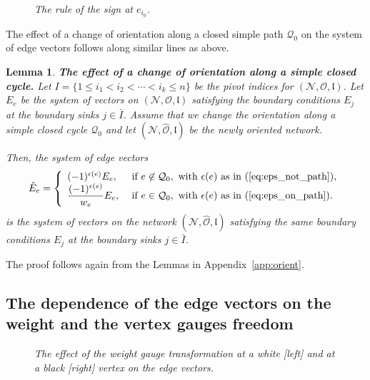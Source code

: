 \documentclass[11pt]{amsart}
\theoremstyle{plain}
\numberwithin{equation}{section}
\newtheorem{lemma}[theorem]{Lemma}
\begin{document}
\begin{figure}%
  \caption{\small{\sl The rule of the sign at $e_{i_0}$.}}\label{fig:edgei_0}
\end{figure}

The effect of a change of orientation along a closed simple path $\mathcal Q_0$ on the system of edge vectors follows along similar lines as above. 

 \begin{lemma}\label{lemma:cycle}\textbf{The effect of a change of orientation along a simple closed cycle.}
Let $I = \{ 1\le i_1 < i_2 < \cdots < i_k\le n\}$ be the pivot indices for $({\mathcal N},\mathcal O,\mathfrak l)$.
Let $E_e$ be the system of vectors on $({\mathcal N},\mathcal O,\mathfrak l)$ satisfying the boundary conditions $E_j$ at the boundary sinks $j\in \bar I$. Assume that we change the orientation along a simple closed cycle $\mathcal Q_0$ and let $({\mathcal N},{\hat {\mathcal O}},\mathfrak l)$ be the newly oriented network. 

Then, the system of edge vectors 
\begin{equation}\label{eq:hat_E_Q}
{\hat E}_e = \left\{ \begin{array}{ll}
 (-1)^{\epsilon(e)} E_e, & \mbox{ if } e\not \in \mathcal Q_0, \mbox{ with } \epsilon(e) \mbox{ as in (\ref{eq:eps_not_path})},\\
\displaystyle \frac{(-1)^{\epsilon(e)}}{w_e} E_e, & \mbox{ if } e\in \mathcal Q_0, \mbox{ with } \epsilon(e) \mbox{ as in (\ref{eq:eps_on_path})}.
\end{array}\right.
\end{equation}
is the system of vectors on the network  $({\mathcal N},{\hat {\mathcal O}},\mathfrak l)$ satisfying the same boundary conditions $E_j$ at the boundary sinks $j\in \bar I$.
\end{lemma}
The proof follows again from the Lemmas in Appendix~\ref{app:orient}.

\subsection{The dependence of the edge vectors on the weight and the vertex gauges freedom}\label{sec:different_gauge}

\begin{figure}
	\vspace{-1.5 truecm}
  \caption{\small{\sl The effect of the weight gauge transformation at a white [left] and at a black [right] vertex on the edge vectors.}\label{fig:weight_gauge_vectors}}
\end{figure}
\end{document}
